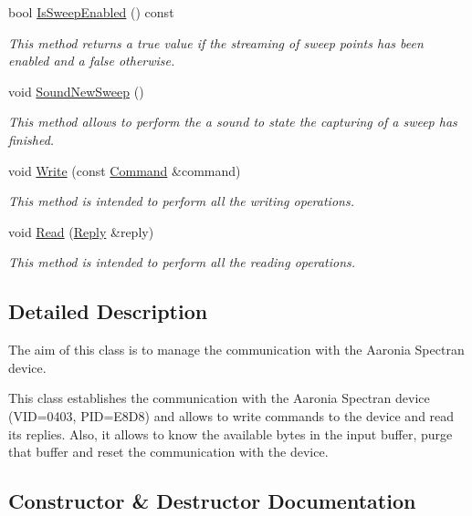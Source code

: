 \begin{DoxyCompactItemize}
bool \hyperlink{classSpectranInterface_ad921e08380e246d03d01b4ad080cec99}{Is\+Sweep\+Enabled} () const
\begin{DoxyCompactList}\small\item\em This method returns a true value if the streaming of sweep points has been enabled and a false otherwise. \end{DoxyCompactList}\item 
void \hyperlink{classSpectranInterface_a6064f5888f86d0913b8c2af429bdf278}{Sound\+New\+Sweep} ()
\begin{DoxyCompactList}\small\item\em This method allows to perform the a sound to state the capturing of a sweep has finished. \end{DoxyCompactList}\item 
void \hyperlink{classSpectranInterface_a3046fce691a5ed248e3fd647b0b043e8}{Write} (const \hyperlink{classCommand}{Command} \&command)
\begin{DoxyCompactList}\small\item\em This method is intended to perform all the writing operations. \end{DoxyCompactList}\item 
void \hyperlink{classSpectranInterface_a63c61d4d26c5aa335c6a20f469f3ec00}{Read} (\hyperlink{classReply}{Reply} \&reply)
\begin{DoxyCompactList}\small\item\em This method is intended to perform all the reading operations. \end{DoxyCompactList}\end{DoxyCompactItemize}


\subsection{Detailed Description}
The aim of this class is to manage the communication with the Aaronia Spectran device. 

This class establishes the communication with the Aaronia Spectran device (V\+ID=0403, P\+ID=E8\+D8) and allows to write commands to the device and read its replies. Also, it allows to know the available bytes in the input buffer, purge that buffer and reset the communication with the device. 

\subsection{Constructor \& Destructor Documentation}
\mbox{\label{classSpectranInterface_a9ace3807dcbbf01313890871d6a60f51}} 
